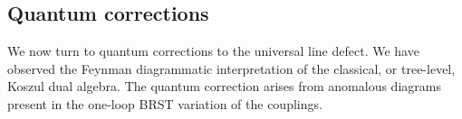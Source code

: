 \documentclass[11pt]{amsart}
\def\brian#1{{\textcolor{blue!65!red}{BRW: {#1}}}}
\begin{document}
%
%

\subsection{Quantum corrections}

We now turn to quantum corrections to the universal line defect.
We have observed the Feynman diagrammatic interpretation of the classical, or tree-level, Koszul dual algebra. 
The quantum correction arises from anomalous diagrams present in the one-loop BRST variation of the couplings. 
\end{document}
